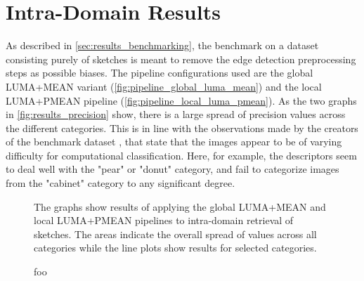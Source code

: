 \section{Intra-Domain Results}\label{sec:intra_results}

As described in \autoref{sec:results_benchmarking}, the benchmark on a dataset
consisting purely of sketches is meant to remove the edge detection
preprocessing steps as possible biases. The pipeline configurations used are
the global LUMA+MEAN variant (\autoref{fig:pipeline_global_luma_mean}) and the
local LUMA+PMEAN pipeline (\autoref{fig:pipeline_local_luma_pmean}). As the two
graphs in \autoref{fig:results_precision} show, there is a large spread of
precision values across the different categories. This is in line with the
observations made by the creators of the benchmark dataset
\autocite{eitz_how_2012}, that state that the images appear to be of varying
difficulty for computational classification. Here, for example, the descriptors
seem to deal well with the "pear" or "donut" category, and fail to categorize
images from the "cabinet" category to any significant degree.

\begin{figure}[h]
    \centering
    \quad
    \caption[Precision and Recall Results]{
        The graphs show results of applying the global LUMA+MEAN
         and local LUMA+PMEAN
         pipelines to
        intra-domain retrieval of sketches. The areas indicate the overall
        spread of values across all categories while the line plots show
        results for selected categories.
    }
    \label{fig:results_precision}
\end{figure}

\begin{figure}[h]
    \centering
    
    \caption[Average Precision by Category]{
        foo
    }
    \label{fig:results_average_precision}
\end{figure}

